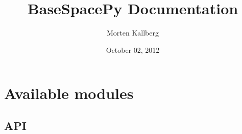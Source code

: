 \documentclass[letterpaper,10pt,english]{sphinxmanual}
\title{BaseSpacePy Documentation}
\date{October 02, 2012}
\author{Morten Kallberg}
\begin{document}
\maketitle
\tableofcontents
{}\label{index::doc}



\chapter{Available modules}
\label{Available modules:available-modules}\label{Available modules::doc}\label{Available modules:basespacepy}

\section{API}
\label{Available modules:api}
\end{document}
